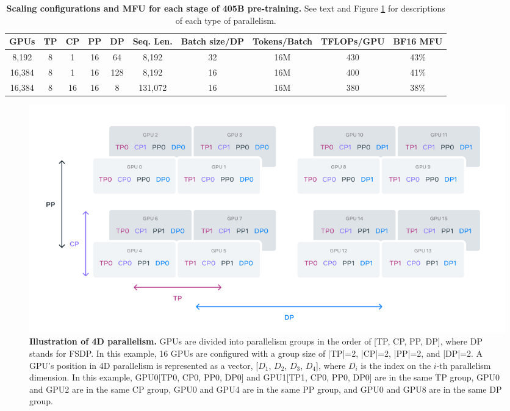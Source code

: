 \begin{table}
	\centering
	\begin{tabular}{cccccccc|cc}
	\toprule
	     \textbf{GPUs} & \textbf{TP} & \textbf{CP} & \textbf{PP} & \textbf{DP}   & \textbf{Seq. Len.} &   \textbf{Batch size/DP} & \textbf{Tokens/Batch} & \textbf{TFLOPs/GPU} & \textbf{BF16 MFU}\\ 
	\midrule
	8,192    & 8 & 1 & 16 & 64   & 8,192   &   32 & 16M  & 430      & 43\%        \\
	16,384   & 8 & 1 & 16 & 128   & 8,192   &   16 & 16M  & 400      & 41\%        \\
	16,384   & 8 & 16 & 16 & 8   & 131,072 &   16 & 16M   & 380     & 38\%        \\
	\bottomrule

	\end{tabular}
\caption{\textbf{Scaling configurations and MFU for each stage of \llamathree 405B pre-training.} See text and Figure \ref{fig:4d_parallelism} for descriptions of each type of parallelism.}
\label{table:mfu}
\end{table}

\begin{figure}[t]
     \centering
     \includegraphics[width=\textwidth]{assets/4D_parallelism.pdf}
     \caption{\textbf{Illustration of 4D parallelism.} GPUs are divided into parallelism groups in the order of [TP, CP, PP, DP], where DP stands for FSDP. In this example, 16 GPUs are configured with a group size of |TP|=2, |CP|=2, |PP|=2, and |DP|=2. 
     A GPU's position in 4D parallelism is represented as a vector, [$D_1$, $D_2$, $D_3$, $D_4$], where $D_i$ is the index on the $i$-th parallelism dimension. In this example,
     GPU0[TP0, CP0, PP0, DP0] and GPU1[TP1, CP0, PP0, DP0] are in the same TP group, GPU0 and GPU2 are in the same CP group, GPU0 and GPU4 are in the same PP group, and GPU0 and GPU8 are in the same DP group.
     }
     \label{fig:4d_parallelism}
\end{figure}

